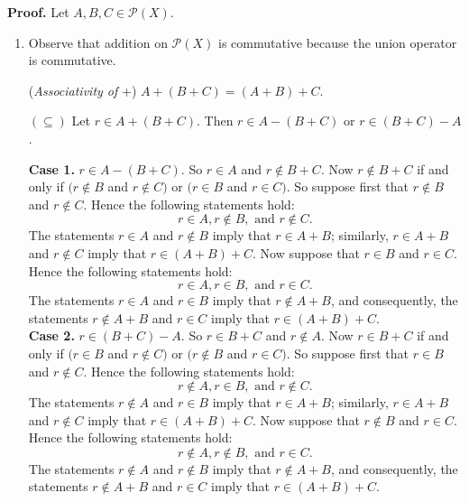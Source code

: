 \begin{enumerate}
      \textbf{Proof.} Let $A, B, C \in \mathcal{P}(X)$.

      \begin{enumerate}
         \item Observe that addition on $\mathcal{P}(X)$ is commutative
               because the union operator is commutative.

               (\textit{Associativity of }+) $A + (B + C) = (A + B) + C$.

               $(\subseteq)$ Let $r \in A + (B + C)$. Then
               $r \in A - (B + C)$ or $r \in (B + C) - A$.

               \textbf{Case 1.} $r \in A - (B + C)$. So $r \in A$ and
               $r \notin B + C$. Now $r \notin B + C$ if and only if
               $(r \notin B$ and $r \notin C)$ or $(r \in B$ and $r \in C)$. So
               suppose first that $r \notin B$ and $r \notin C$. Hence the
               following statements hold:
               $$r \in A, r \notin B, \text{ and }r \notin C.$$
               The statements $r \in A$ and $r \notin B$ imply that
               $r \in A + B$; similarly, $r \in A + B$ and $r \notin C$ imply 
               that $r \in (A + B) + C$. Now suppose that
               $r \in B$ and $r \in C$. Hence the
               following statements hold:
               $$r \in A, r \in B, \text{ and }r \in C.$$
               The statements $r \in A$ and $r \in B$ imply that
               $r \notin A + B$, and consequently, the statements 
               $r \notin A + B$ and $r \in C$ imply that $r \in (A + B) + C$. \\

               \textbf{Case 2.} $r \in (B + C) - A$. So $r \in B + C$ and
               $r \notin A$. Now $r \in B + C$ if and only if
               $(r \in B$ and $r \notin C)$ or $(r \notin B$ and $r \in C)$. So
               suppose first that $r \in B$ and $r \notin C$. Hence the
               following statements hold:
               $$r \notin A, r \in B, \text{ and }r \notin C.$$
               The statements $r \notin A$ and $r \in B$ imply that
               $r \in A + B$; similarly, $r \in A + B$ and $r \notin C$ imply 
               that $r \in (A + B) + C$. Now suppose that
               $r \notin B$ and $r \in C$. Hence the
               following statements hold:
               $$r \notin A, r \notin B, \text{ and }r \in C.$$
               The statements $r \notin A$ and $r \notin B$ imply that
               $r \notin A + B$, and consequently, the statements 
               $r \notin A + B$ and $r \in C$ imply that $r \in (A + B) + C$. \\


\end{enumerate}
\end{enumerate}

